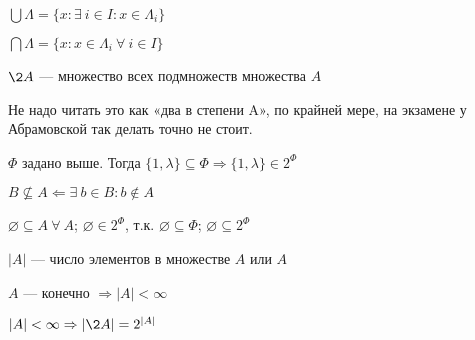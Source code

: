 \begin{sh-designation}
    $\bigcup \Lambda = \{x: \exists ~i \in I: x \in \Lambda_i\}$
\end{sh-designation}

\begin{sh-designation}
    $\bigcap \Lambda = \{x: x \in \Lambda_i ~\forall ~i \in I\}$
\end{sh-designation}

\begin{sh-designation}
    $\2{A}$ — множество всех подмножеств множества $A$
\end{sh-designation}

\begin{sh-remark}
    Не надо читать это как «два в степени A», по крайней мере, на экзамене у Абрамовской так делать точно не стоит.
\end{sh-remark}

\begin{sh-example}
    $\Phi$ задано выше. Тогда $\{1, \lambda\} \subseteq \Phi \Rightarrow \{1, \lambda\} \in 2^\Phi$
\end{sh-example}

\begin{sh-designation}
    $B \not\subseteq A \Leftarrow \exists ~b \in B: b \notin A$
\end{sh-designation}

\begin{sh-remark}
    $\varnothing \subseteq A ~\forall ~A$; $\varnothing \in 2^\Phi$, т.к. $\varnothing \subseteq \Phi$; $\varnothing \subseteq 2^\Phi$
\end{sh-remark}

\begin{sh-definition}
    $\left|A\right|$ — число элементов в множестве $A$ или  $A$
\end{sh-definition}

\begin{sh-designation}
    $A$ — конечно $\Rightarrow \left|A\right| < \infty$
\end{sh-designation}

\begin{sh-proposition}
    $|A| < \infty \Rightarrow \left|\2{A}\right|=2^{\left|A\right|}$
\end{sh-proposition}

